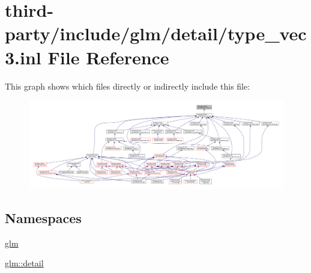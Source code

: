 \hypertarget{type__vec3_8inl}{}\section{third-\/party/include/glm/detail/type\+\_\+vec3.inl File Reference}
\label{type__vec3_8inl}
This graph shows which files directly or indirectly include this file\+:
\nopagebreak
\begin{figure}[H]
\begin{center}
\leavevmode
\includegraphics[width=350pt]{type__vec3_8inl__dep__incl}
\end{center}
\end{figure}
\subsection*{Namespaces}
\begin{DoxyCompactItemize}
\item 
 \hyperlink{namespaceglm}{glm}
\item 
 \hyperlink{namespaceglm_1_1detail}{glm\+::detail}
\end{DoxyCompactItemize}

